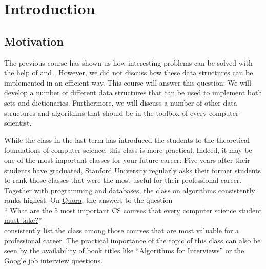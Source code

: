 \chapter{Introduction}
\section{Motivation}
The previous course has shown us how interesting problems can be solved with the
help of  and .  However, we did not discuss how these data structures can be
implemented in an efficient way.  This course will answer this question:  We will develop a number of different data structures
that can be used to implement both sets and dictionaries.  Furthermore, we will discuss a number of
other data structures and algorithms that should be in the toolbox of every computer scientist.

While the class in the last term has introduced the students to the theoretical foundations of
computer science, this class is more practical.  Indeed, it may be one of the most 
important classes for your future career: Five years after their students have graduated, Stanford University
regularly asks their former students to rank those classes that were the most useful for their professional
career.  Together with programming and databases, the class on algorithms consistently ranks highest.
On \href{https://quora.com}{Quora}, the answers to the question
\\[0.1cm]
\hspace*{0.8cm}
``\href{https://www.quora.com/What-are-the-5-most-important-CS-courses-that-every-computer-science-student-must-take}{
  What are the 5 most important CS courses that every computer science student must take?}''
\\[0.1cm]
consistently list the class  among those courses that are most valuable
for a professional career.  The practical importance of the topic of this class can also be seen by the
availability of book titles like
``\href{https://www.amazon.com/Algorithms-Interviews-Adnan-Aziz/dp/1453792996}{Algorithms for Interviews}''  
\cite{aziz:10} or the \href{http://www.youtube.com/watch?v=k4RRi_ntQc8}{Google job interview questions}.
 
 
